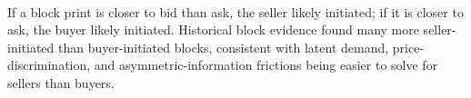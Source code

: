 \documentclass[a4paper,oneside,openany]{book}
\begin{document}
\begin{empiricalfinding} \\
If a block print is closer to bid than ask, the seller likely initiated; if it is closer to ask, the buyer likely initiated. Historical block evidence found many more seller-initiated than buyer-initiated blocks, consistent with latent demand, price-discrimination, and asymmetric-information frictions being easier to solve for sellers than buyers.
\end{empiricalfinding}
\end{document}
